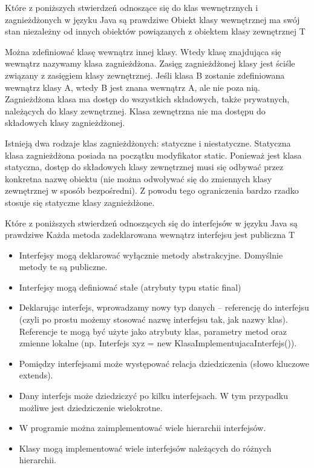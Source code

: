 \answer
{Które z poniższych stwierdzeń odnoszące się do klas wewnętrznych i zagnieżdżonych w języku Java są prawdziwe}
{Obiekt klasy wewnętrznej ma swój stan niezależny od innych obiektów powiązanych z obiektem klasy zewnętrznej}
{T}
{}
{
Można zdefiniować klasę wewnątrz innej klasy. Wtedy klasę znajdująca się wewnątrz nazywamy klasa zagnieżdżona. Zasięg zagnieżdżonej klasy jest ściśle związany z zasięgiem klasy zewnętrznej. Jeśli klasa B zostanie zdefiniowana wewnątrz klasy A, wtedy B jest znana wewnątrz A, ale nie poza nią. Zagnieżdżona klasa ma dostęp do wszystkich składowych, także prywatnych, należących do klasy zewnętrznej. Klasa zewnętrzna nie ma dostępu do składowych klasy zagnieżdżonej.

Istnieją dwa rodzaje klas zagnieżdżonych: statyczne i niestatyczne. Statyczna klasa zagnieżdżona posiada na początku modyfikator static. Ponieważ jest klasa statyczna, dostęp do składowych klasy zewnętrznej musi się odbywać przez konkretna nazwę obiektu (nie można odwoływać się do zmiennych klasy zewnętrznej w sposób bezpośredni). Z powodu tego ograniczenia bardzo rzadko stosuje się statyczne klasy zagnieżdżone.
}

\answer
{Które z poniższych stwierdzeń odnoszących się do interfejsów w języku Java są prawdziwe}
{Każda metoda zadeklarowana wewnątrz interfejsu jest publiczna}
{T}
{\begin{itemize}
	\item Interfejsy mogą deklarować wyłącznie metody abstrakcyjne. Domyślnie metody te są publiczne.
 	\item Interfejsy mogą definiować stałe (atrybuty typu static final)
 	\item Deklarując interfejs, wprowadzamy nowy typ danych – referencję do interfejsu (czyli po prostu możemy stosować nazwę interfejsu tak, jak nazwy klas). Referencje te mogą być użyte jako atrybuty klas, parametry metod oraz zmienne lokalne (np. Interfejs xyz = new KlasaImplementujacaInterfejs()).
 	\item Pomiędzy interfejsami może występować relacja dziedziczenia (słowo kluczowe extends).
	\item Dany interfejs może dziedziczyć po kilku interfejsach. W tym przypadku możliwe jest dziedziczenie wielokrotne.
 	\item W programie można zaimplementować wiele hierarchii interfejsów. 
 	\item Klasy mogą implementować wiele interfejsów należących do różnych hierarchii.
\end{itemize}}
{}

